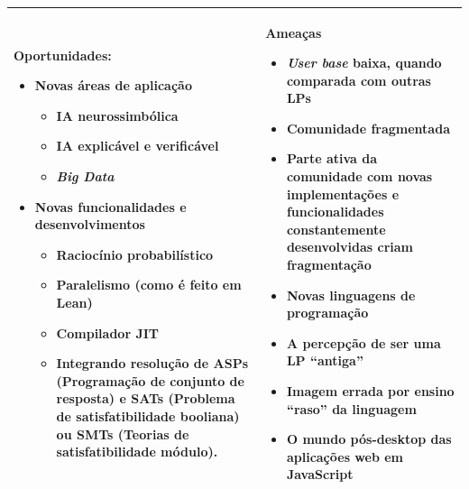 \begin{table}[htb]
{\begin{tabular}{| p{} | p{} |}
        \\ \hline

        \textbf{Oportunidades}: 
        
        \begin{itemize}
            \item Novas áreas de aplicação
            \begin{itemize}
                \item IA neurossimbólica
                \item IA explicável e verificável
                \item \textit{Big Data}
            \end{itemize}

            \item Novas funcionalidades e desenvolvimentos
            \begin{itemize}
                \item Raciocínio probabilístico
                \item Paralelismo (como é feito em Lean)
                \item Compilador JIT
                \item Integrando resolução de ASPs (Programação de conjunto de
                resposta) e SATs (Problema de satisfatibilidade booliana) ou
                SMTs (Teorias de satisfatibilidade módulo).
            \end{itemize}
        \end{itemize} & 
        \textbf{Ameaças}
        
        \begin{itemize}
            \item \textit{User base} baixa, quando comparada com outras LPs
            \item Comunidade fragmentada
            \item Parte ativa da comunidade com novas implementações e
            funcionalidades constantemente desenvolvidas criam fragmentação
            \item Novas linguagens de programação
            \item A percepção de ser uma LP ``antiga''
            \item Imagem errada por ensino ``raso'' da linguagem
            \item O mundo pós-desktop das aplicações web em JavaScript
        \end{itemize}\\ \hline
    \end{tabular}%
    }

\end{table}